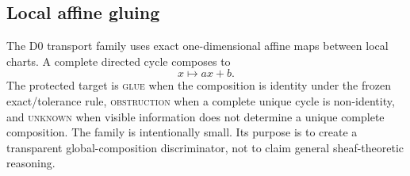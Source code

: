 \subsection{Local affine gluing}

The D0 transport family uses exact one-dimensional affine maps between local charts. A complete directed cycle composes to
\[
x \mapsto ax+b.
\]
The protected target is \textsc{glue} when the composition is identity under the frozen exact/tolerance rule, \textsc{obstruction} when a complete unique cycle is non-identity, and \textsc{unknown} when visible information does not determine a unique complete composition. The family is intentionally small. Its purpose is to create a transparent global-composition discriminator, not to claim general sheaf-theoretic reasoning.


